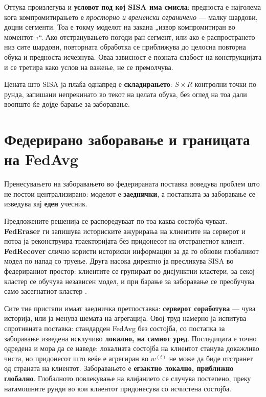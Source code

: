 Оттука произлегува и \textbf{условот под кој SISA има смисла}: предноста е најголема кога
компромитирањето е \emph{просторно и временски ограничено} --- малку шардови, доцни сегменти. Тоа
е токму моделот на закана „извор компромитиран во моментот $\tau$“. Ако отстранувањето
погоди ран сегмент, или ако е распространето низ сите шардови, повторната обработка се
приближува до целосна повторна обука и предноста исчезнува. Оваа зависност е позната
слабост на конструкцијата и се третира како услов на важење, не се премолчува.

Цената што SISA ја плаќа однапред е \textbf{складирањето}: $S \times R$ контролни точки по
рунда, запишани непрекинато во текот на целата обука, без оглед на тоа дали воопшто ќе
дојде барање за заборавање.

\section{Федерирано заборавање и границата на FedAvg}

Пренесувањето на заборавањето во федерираната поставка \cite{liu2024fusurvey,
romandini2024fusurvey} воведува проблем што не постои централизирано: моделот е
\textbf{заеднички}, а постапката за заборавање се изведува кај \textbf{еден} учесник.

Предложените решенија се распоредуваат по тоа каква состојба чуваат. \textbf{FedEraser}
\cite{liu2021federaser} ги запишува историските ажурирања на клиентите на серверот и потоа
ја реконструира траекторијата без придонесот на отстранетиот клиент. \textbf{FedRecover}
\cite{cao2023fedrecover} слично користи историски информации за да го обнови глобалниот
модел по напад со труење. Друга насока директно ја пресликува SISA во федерираниот
простор: клиентите се групираат во дисјунктни кластери, за секој кластер се обучува
независен модел, и при барање за заборавање се преобучува само засегнатиот кластер
\cite{lin2024codedsharding}.

Сите тие пристапи имаат заедничка претпоставка: \textbf{серверот соработува} --- чува историја,
или ја менува шемата на агрегација. Овој труд намерно ја испитува спротивната поставка:
стандарден FedAvg без состојба, со постапка за заборавање изведена исклучиво \textbf{локално, на
самиот уред}. Последицата е точно одредена и мора да се наведе: локалната состојба на
клиентот станува докажливо чиста, но придонесот што веќе е агрегиран во $w^{(t)}$ не може
да биде отстранет од страната на клиентот. Заборавањето е \textbf{егзактно локално, приближно
глобално}. Глобалното повлекување на влијанието се случува постепено, преку натамошните
рунди во кои клиентот придонесува со исчистена состојба.

